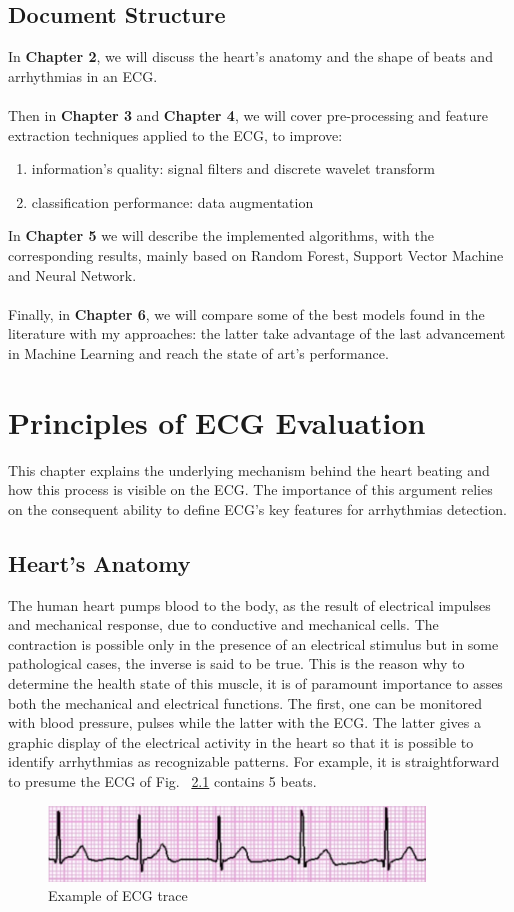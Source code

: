 \documentclass[LaM,binding=0.6cm]{sapthesis}
\begin{document}
\section{Document Structure}
In \textbf{Chapter 2}, we will discuss the heart's anatomy and the shape of beats and arrhythmias in an ECG.\\\\Then in \textbf{Chapter 3} and \textbf{Chapter 4}, we will cover pre-processing and feature extraction techniques applied to the ECG, to improve:
\begin{enumerate}
\item information's quality: signal filters and discrete wavelet transform
\item classification performance: data augmentation 
\end{enumerate}
In \textbf{Chapter 5} we will describe the implemented algorithms, with the corresponding results, mainly based on Random Forest, Support Vector Machine and Neural Network.\\\\Finally, in \textbf{Chapter 6}, we will compare some of the best models found in the literature with my approaches: the latter take advantage of the last advancement in Machine Learning and reach the state of art's performance.


\chapter{Principles of ECG Evaluation}
This chapter explains the underlying mechanism behind the heart beating and how this process is visible on the ECG. The importance of this argument relies on the consequent ability to define ECG's key features for arrhythmias detection.

\section{Heart's Anatomy }

The human heart pumps blood to the body, as the result of electrical impulses and mechanical response, due to conductive and mechanical cells. The contraction is possible only in the presence of an electrical stimulus but in some pathological cases, the inverse is said to be true. This is the reason why to determine the health state of this muscle, it is of paramount importance to asses both the mechanical and electrical functions. The first, one can be monitored with blood pressure, pulses while the latter with the ECG. The latter gives a graphic display of the electrical activity in the heart so that it is possible to identify arrhythmias as recognizable patterns. For example, it is straightforward to presume the ECG of Fig. ~\ref{fig:ecgex} contains 5 beats.
\begin{figure} \centering
    \includegraphics[width=100mm,scale=0.7]{ecgtrace}
    \caption{Example of ECG trace}
    \label{fig:ecgex}
\end{figure}
\end{document}

